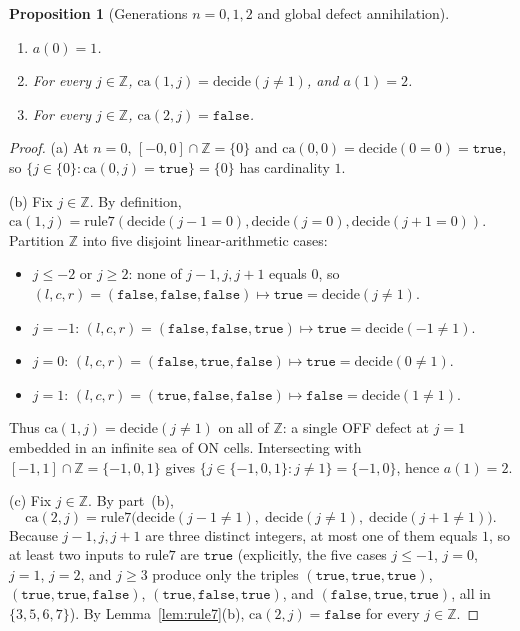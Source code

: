 \documentclass[11pt]{article}
\newtheorem{proposition}[theorem]{Proposition}
\theoremstyle{definition}
\newcommand{\Z}{\mathbb{Z}}
\newcommand{\ca}{\mathrm{ca}}
\newcommand{\ruleSeven}{\mathrm{rule7}}
\newcommand{\btrue}{\mathtt{true}}
\newcommand{\bfalse}{\mathtt{false}}
\begin{document}
\begin{proposition}[Generations $n = 0, 1, 2$ and global defect annihilation]
\label{prop:early}
\leavevmode
\begin{enumerate}
\item[\textup{(a)}] $a(0) = 1$.
\item[\textup{(b)}] For every $j \in \Z$, $\ca(1, j) = \mathrm{decide}(j \ne 1)$, and $a(1) = 2$.
\item[\textup{(c)}] For every $j \in \Z$, $\ca(2, j) = \bfalse$.
\end{enumerate}
\end{proposition}

\begin{proof}
(a) At $n = 0$, $[-0, 0] \cap \Z = \{0\}$ and $\ca(0, 0) = \mathrm{decide}(0 = 0) = \btrue$, so $\{j \in \{0\} : \ca(0, j) = \btrue\} = \{0\}$ has cardinality $1$.

(b) Fix $j \in \Z$. By definition, $\ca(1, j) = \ruleSeven(\mathrm{decide}(j - 1 = 0), \mathrm{decide}(j = 0), \mathrm{decide}(j + 1 = 0))$. Partition $\Z$ into five disjoint linear-arithmetic cases:
\begin{itemize}
\item $j \le -2$ or $j \ge 2$: none of $j - 1, j, j + 1$ equals $0$, so $(l, c, r) = (\bfalse, \bfalse, \bfalse) \mapsto \btrue = \mathrm{decide}(j \ne 1)$.
\item $j = -1$: $(l, c, r) = (\bfalse, \bfalse, \btrue) \mapsto \btrue = \mathrm{decide}(-1 \ne 1)$.
\item $j = 0$: $(l, c, r) = (\bfalse, \btrue, \bfalse) \mapsto \btrue = \mathrm{decide}(0 \ne 1)$.
\item $j = 1$: $(l, c, r) = (\btrue, \bfalse, \bfalse) \mapsto \bfalse = \mathrm{decide}(1 \ne 1)$.
\end{itemize}
Thus $\ca(1, j) = \mathrm{decide}(j \ne 1)$ on all of $\Z$: a single OFF defect at $j = 1$ embedded in an infinite sea of ON cells. Intersecting with $[-1, 1] \cap \Z = \{-1, 0, 1\}$ gives $\{j \in \{-1, 0, 1\} : j \ne 1\} = \{-1, 0\}$, hence $a(1) = 2$.

(c) Fix $j \in \Z$. By part~(b),
\[
\ca(2, j) = \ruleSeven\bigl(\mathrm{decide}(j - 1 \ne 1),\; \mathrm{decide}(j \ne 1),\; \mathrm{decide}(j + 1 \ne 1)\bigr).
\]
Because $j - 1, j, j + 1$ are three distinct integers, at most one of them equals $1$, so at least two inputs to $\ruleSeven$ are $\btrue$ (explicitly, the five cases $j \le -1$, $j = 0$, $j = 1$, $j = 2$, and $j \ge 3$ produce only the triples $(\btrue,\btrue,\btrue)$, $(\btrue,\btrue,\bfalse)$, $(\btrue,\bfalse,\btrue)$, and $(\bfalse,\btrue,\btrue)$, all in $\{3, 5, 6, 7\}$). By Lemma~\ref{lem:rule7}(b), $\ca(2, j) = \bfalse$ for every $j \in \Z$.
\end{proof}
\end{document}
